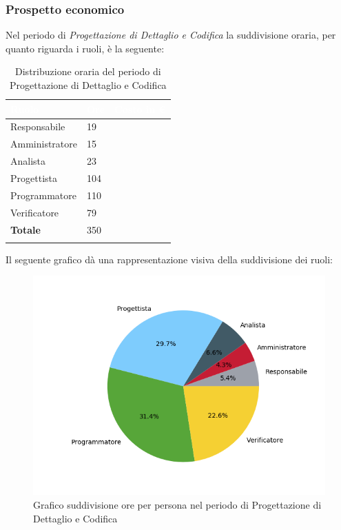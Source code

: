 \subsubsection{Prospetto economico}

Nel periodo di \textit{Progettazione di Dettaglio e Codifica} la suddivisione oraria, per quanto riguarda i ruoli, è la seguente: 

\begin{longtable}{| C{.30\textwidth}| C{.15\textwidth}| C{.20\textwidth}|}
	\hline
	\textbf{\textcolor{white}{Ruolo}} & \textbf{\textcolor{white}{Ore}} & \textbf{\textcolor{white}{Costo in \euro}} \\
	\hline 
	Responsabile & 19 &  \\
	\hline
	Amministratore & 15 & \\
	\hline
	Analista & 23 &  \\
	\hline
	Progettista & 104 &  \\
	\hline
	Programmatore & 110 &  \\
	\hline
	Verificatore & 79 &  \\
	\hline
	\textbf{Totale} & 350 & \\ 
	\hline
	
	\caption{Distribuzione oraria del periodo di Progettazione di Dettaglio e Codifica}
	\label{Distribuzione oraria pdc}
\end{longtable}

Il seguente grafico dà una rappresentazione visiva della suddivisione dei ruoli:
\begin{figure}[H]
	\centering
	\includegraphics[width=1\linewidth]{./images/torta_pdc.png}
	\caption{Grafico suddivisione ore per persona nel periodo di Progettazione di Dettaglio e Codifica}
	\label{fig:grafico suddivione ruoli periodo pdc}
\end{figure}


